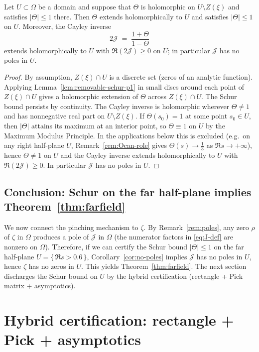 \documentclass[11pt]{article}
\begin{document}
\begin{corollary}\label{cor:no-poles}
Let $U\subset\Omega$ be a domain and suppose that $\Theta$ is holomorphic on $U\setminus Z(\xi)$ and satisfies $|\Theta|\le 1$ there.
Then $\Theta$ extends holomorphically to $U$ and satisfies $|\Theta|\le 1$ on $U$.
Moreover, the Cayley inverse
\[
  2\mathcal J \;=\; \frac{1+\Theta}{1-\Theta}
\]
extends holomorphically to $U$ with $\Re(2\mathcal J)\ge 0$ on $U$; in particular $\mathcal J$ has no poles in $U$.
\end{corollary}
\begin{proof}
By assumption, $Z(\xi)\cap U$ is a discrete set (zeros of an analytic function).
Applying Lemma~\ref{lem:removable-schur-p1} in small discs around each point of $Z(\xi)\cap U$ gives a holomorphic extension of $\Theta$ across $Z(\xi)\cap U$.
The Schur bound persists by continuity.
The Cayley inverse is holomorphic wherever $\Theta\neq 1$ and has nonnegative real part on $U\setminus Z(\xi)$.
If $\Theta(s_0)=1$ at some point $s_0\in U$, then $|\Theta|$ attains its maximum at an interior point, so $\Theta\equiv 1$ on $U$ by the Maximum Modulus Principle.
In the applications below this is excluded (e.g.\ on any right half-plane $U$, Remark~\ref{rem:Ocan-role} gives $\Theta(s)\to \tfrac13$ as $\Re s\to+\infty$), hence $\Theta\neq 1$ on $U$ and the Cayley inverse extends holomorphically to $U$ with $\Re(2\mathcal J)\ge 0$.
In particular $\mathcal J$ has no poles in $U$.
\end{proof}

\subsection*{Conclusion: Schur on the far half-plane implies Theorem~\ref{thm:farfield}}
We now connect the pinching mechanism to $\zeta$.
By Remark~\ref{rem:poles}, any zero $\rho$ of $\zeta$ in $\Omega$ produces a pole of $\mathcal J$ in $\Omega$ (the numerator factors in \eqref{eq:J-def} are nonzero on $\Omega$).
Therefore, if we can certify the Schur bound $|\Theta|\le 1$ on the far half-plane $U=\{\,\Re s>0.6\,\}$, Corollary~\ref{cor:no-poles} implies $\mathcal J$ has no poles in $U$, hence $\zeta$ has no zeros in $U$.
This yields Theorem~\ref{thm:farfield}.
The next section discharges the Schur bound on $U$ by the hybrid certification (rectangle + Pick matrix + asymptotics).

\section{Hybrid certification: rectangle + Pick + asymptotics}\label{sec:hybrid}
\end{document}
